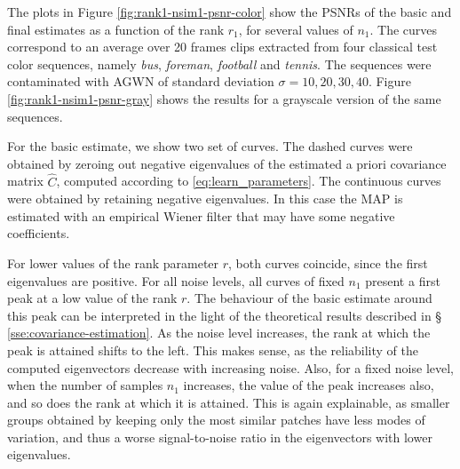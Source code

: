 \documentclass[10pt, a4paper]{article}
\newcommand{\pa}[1]{#1}
\newcommand{\prm}[1]{\pa{\sout{#1}}}
\newcommand{\padd}[1]{\pa{#1}}
\newcommand{\pcomment}[1]{}
\begin{document}



The plots in Figure \ref{fig:rank1-nsim1-psnr-color} show the PSNRs of the
basic and final estimates as a function of the rank $r_1$, for several values
of $n_{1}$. The curves correspond to an average over 20 frames clips extracted
from four classical test color sequences, namely \emph{bus}, \emph{foreman},
\emph{football} and
\emph{tennis}. The sequences were contaminated with
AGWN of standard deviation $\sigma = 10, 20, 30, 40$. 
Figure \ref{fig:rank1-nsim1-psnr-gray} shows the results for a
grayscale version of the same sequences. 
%
%

\padd{For the basic estimate, we show two set of curves. The dashed curves were
obtained by zeroing out negative eigenvalues of the estimated a priori covariance
matrix $\widehat C$, computed according to \eqref{eq:learn_parameters}. The continuous curves 
were obtained by retaining negative eigenvalues. In this case the MAP is estimated
with an empirical Wiener filter that may have some negative coefficients.}

\padd{For lower values of the rank parameter $r$, both curves coincide, since the first
eigenvalues are positive. 
For all noise levels, all curves of fixed $n_1$ present a first peak at a low value of the rank $r$.
The behaviour of the basic estimate around this peak can be
interpreted in the light of the theoretical results described in \S
\ref{sse:covariance-estimation}.
As the noise level increases, the rank at which the peak is attained
shifts to the left. This makes sense, as the reliability of the computed eigenvectors
decrease with increasing noise.
%
Also, for a fixed noise level, when the number of samples $n_1$ increases, the value
of the peak increases also, and so does the rank at which it is attained.
This is again explainable, as smaller groups obtained by keeping only the
most similar patches have less modes of variation, and thus a worse signal-to-noise ratio
in the eigenvectors with lower eigenvalues.}
\end{document}
